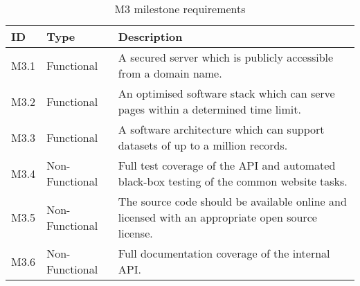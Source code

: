\begin{table}[H]
\centering
\begin{tabular}{ l l p{12cm} }
\textbf{ID} & \textbf{Type} & \textbf{Description}\\ \hline

M3.1 & Functional & A secured server which is publicly accessible from a domain
name.\\

M3.2 & Functional & An optimised software stack which can serve pages within a
determined time limit.\\

M3.3 & Functional & A software architecture which can support datasets of up to
a million records.\\

M3.4 & Non-Functional & Full test coverage of the API and automated black-box
testing of the common website tasks.\\

M3.5 & Non-Functional & The source code should be available online and licensed
with an appropriate open source license.\\

M3.6 & Non-Functional & Full documentation coverage of the internal API.\\

\hline
\end{tabular}
\caption{M3 milestone requirements}
\label{tab:m3-requirements}
\end{table}
